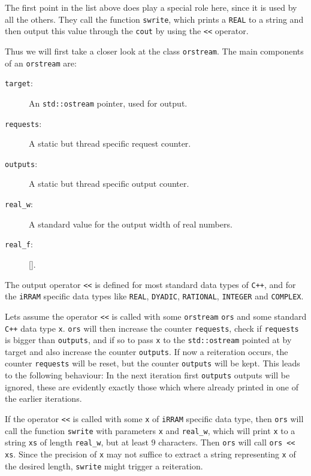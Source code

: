 \documentclass{article}
\newcommand{\irram}{\texttt{iRRAM}\xspace}
\newcommand{\cc}{\texttt{C++}\xspace}
\newcommand{\ir}[1]{\texttt{#1}}
\newcommand{\code}[1]{\texttt{#1}}
\begin{document}
The first point in the list above does play a special role here, since it is used by all the others. They call the function \ir{swrite}, which prints a \ir{REAL} to a string and then output this value through the \ir{cout} by using the \ir{<<} operator.

Thus we will first take a closer look at the class \ir{orstream}. The main components of an \ir{orstream} are:
\begin{description}
\item[\code{target}:] An \code{std::ostream} pointer, used for output.
\item[\code{requests}:] A static but thread specific request counter.
\item[\code{outputs}:] A static but thread specific output counter.
\item[\code{real\_w}:] A standard value for the output width of real numbers.
\item[\code{real\_f}:] \ref{}.
\end{description}
The output operator \code{<<} is defined for most standard data types of \cc, and for the \irram specific data types like \ir{REAL}, \ir{DYADIC}, \ir{RATIONAL}, \ir{INTEGER} and \ir{COMPLEX}.

Lets assume the operator \code{<<} is called with some \ir{orstream} \code{ors} and some standard \cc data type \code{x}. \code{ors} will then increase the counter \code{requests}, check if \code{requests} is bigger than \code{outputs}, and if so to pass \code{x} to the \ir{std::ostream} pointed at by target and also increase the counter \code{outputs}. If now a reiteration occurs, the counter \code{requests} will be reset, but the counter \code{outputs} will be kept. This leads to the following behaviour: In the next iteration first \code{outputs} outputs will be ignored, these are evidently exactly those which where already printed in one of the earlier iterations.

If the operator \code{<<} is called with some \code{x} of \irram specific data type, then \code{ors} will call the function \ir{swrite} with parameters \code{x} and \ir{real\_w}, which will print \code{x} to a string \code{xs} of length \ir{real\_w}, but at least $9$ characters. Then \code{ors} will call \code{ors << xs}. Since the precision of \code{x} may not suffice to extract a string representing \code{x} of the desired length, \ir{swrite} might trigger a reiteration.
\end{document}
